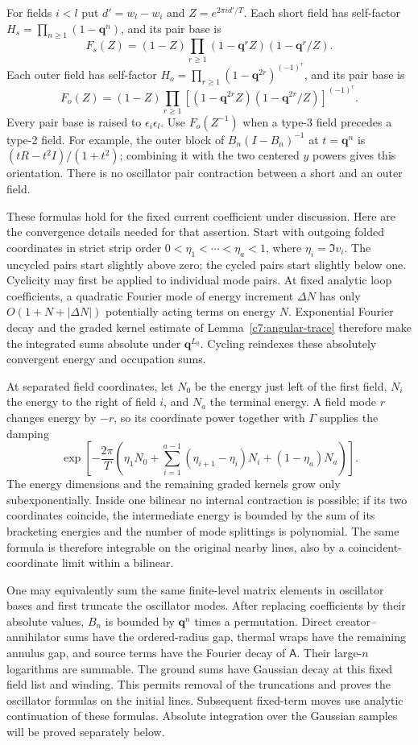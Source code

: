 For fields $i<l$ put $d'=w_l-w_i$ and $Z=e^{2\pi i d'/T}$.  Each short field
has self-factor $H_s=\prod_{n\ge1}(1-\mathbf q^n)$, and its pair base is
\[
F_s(Z)=(1-Z)\prod_{r\ge1}(1-\mathbf q^rZ)(1-\mathbf q^r/Z).
\]
Each outer field has self-factor
$H_o=\prod_{r\ge1}(1-\mathbf q^{2r})^{(-1)^r}$, and its pair base is
\[
F_o(Z)=(1-Z)\prod_{r\ge1}
 [(1-\mathbf q^{2r}Z)(1-\mathbf q^{2r}/Z)]^{(-1)^r}.
\]
Every pair base is raised to $\epsilon_i\epsilon_l$.  Use $F_o(Z^{-1})$
when a type-3 field precedes a type-2 field.  For example, the outer block of
$B_n(I-B_n)^{-1}$ at $t=\mathbf q^n$ is
$(tR-t^2I)/(1+t^2)$; combining it with the two centered $y$ powers gives
this orientation.  There is no oscillator pair contraction between a short
and an outer field.

These formulas hold for the fixed current coefficient under discussion.
Here are the convergence details needed for that assertion.  Start with
outgoing folded coordinates in strict strip order
$0<\eta_1<\cdots<\eta_a<1$, where $\eta_i=\Im v_i$.  The uncycled pairs
start slightly above zero; the cycled pairs start slightly below one.
Cyclicity may first be applied to individual mode pairs.  At fixed analytic
loop coefficients, a quadratic Fourier mode of energy increment $\Delta N$
has only $O(1+N+|\Delta N|)$ potentially acting terms on energy $N$.
Exponential Fourier decay and the graded kernel estimate of
Lemma~\ref{c7:angular-trace} therefore make the integrated sums absolute
under $\mathbf q^{L_0}$.  Cycling reindexes these absolutely convergent
energy and occupation sums.

At separated field coordinates, let $N_0$ be the energy just left of the
first field, $N_i$ the energy to the right of field $i$, and $N_a$ the
terminal energy.  A field mode $r$ changes energy by $-r$, so its coordinate
power together with $\Gamma$ supplies the damping
\[
\exp\!\left[-\frac{2\pi}{T}\left(
 \eta_1N_0+\sum_{i=1}^{a-1}(\eta_{i+1}-\eta_i)N_i
 +(1-\eta_a)N_a\right)\right].
\]
The energy dimensions and the remaining graded kernels grow only
subexponentially.  Inside one bilinear no internal contraction is possible;
if its two coordinates coincide, the intermediate energy is bounded by the
sum of its bracketing energies and the number of mode splittings is
polynomial.  The same formula is therefore integrable on the original nearby
lines, also by a coincident-coordinate limit within a bilinear.

One may equivalently sum the same finite-level matrix elements in oscillator
bases and first truncate the oscillator modes.  After replacing coefficients
by their absolute values, $B_n$ is bounded by $\mathbf q^n$ times a
permutation.  Direct creator--annihilator sums have the ordered-radius gap,
thermal wraps have the remaining annulus gap, and source terms have the
Fourier decay of $\mathsf A$.  Their large-$n$ logarithms are summable.
The ground sums have Gaussian decay at this fixed field list and winding.
This permits removal of the truncations and proves the oscillator formulas
on the initial lines.  Subsequent fixed-term moves use analytic continuation
of these formulas.  Absolute integration over the Gaussian samples will be
proved separately below.

